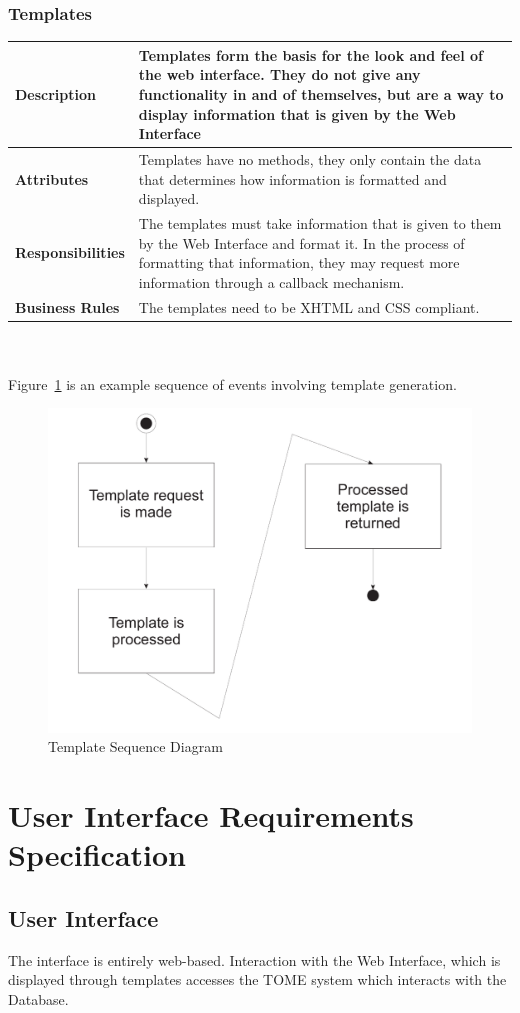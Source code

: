 \documentclass[12pt,titlepage]{article}
\begin{document}
\subsubsection{Templates}
\begin{tabular}{|p{}|p{}|}
	\hline
	\textbf{Description} & Templates form the basis for the look and feel of the web interface.  They do not give any functionality in and of themselves, but are a way to display information that is given by the Web Interface\\
	\hline
	\textbf{Attributes} & Templates have no methods, they only contain the data that determines how information is formatted and displayed.\\
	\hline
	\textbf{Responsibilities} & The templates must take information that is given to them by the Web Interface and format it.  In the process of formatting that information, they may request more information through a callback mechanism.\\
	\hline
	\textbf{Business Rules} & The templates need to be XHTML and CSS compliant. \\
	\hline
\end{tabular}
\\
\\
Figure~\ref{TemplateSequenceDiagram} is an example sequence of events involving template generation.
\begin{figure}[h]
	\centering
	\includegraphics[width=.5\textwidth]{TemplateSequenceDiagram}
	\caption{Template Sequence Diagram}
	\label{TemplateSequenceDiagram}
\end{figure}

\section{User Interface Requirements Specification}
\subsection{User Interface}
The interface is entirely web-based.  Interaction with the Web Interface, which is displayed through templates accesses the TOME system which interacts with the Database.
\end{document}
